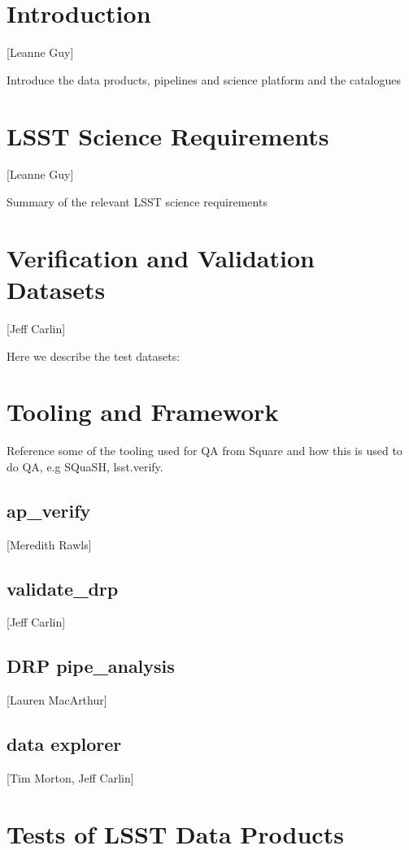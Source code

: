 
\section{Introduction}
[Leanne Guy]

Introduce the data products, pipelines and science platform and the catalogues

\section{LSST Science Requirements}
[Leanne Guy]
 
 Summary of the relevant LSST science requirements 
 
\section{Verification and Validation Datasets} 
[Jeff Carlin]

Here we describe the test datasets: \cite{DMTN-091}

\section{Tooling  and Framework} 

Reference some of the  tooling used  for QA  from Square \cite{pstn-023} and how this is used to do QA, e.g SQuaSH, lsst.verify. 

\subsection{ap\_verify} 
[Meredith Rawls]

\subsection{validate\_drp}
[Jeff Carlin]

\subsection{ DRP pipe\_analysis}
[Lauren MacArthur]

\subsection{data explorer}
[Tim Morton, Jeff Carlin]

\section{Tests of LSST Data Products } 

